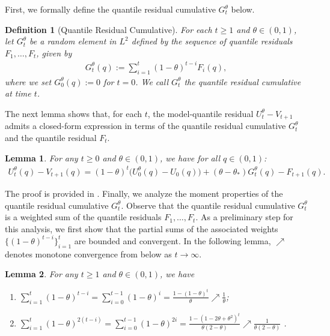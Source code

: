 \documentclass[a4paper, 11pt]{article}
\newtheorem{lemma}{Lemma}
\newtheorem{definition}{Definition}
\theoremstyle{definition}
\begin{document}
First, we formally define the quantile residual cumulative $G_t^\theta$ below.

\begin{definition}[Quantile Residual Cumulative] \label{def:residual_cumulative}
	For each $t \ge 1$ and $\theta \in (0, 1)$, let $G_t^\theta$ be a random element in $L^2$ defined by the sequence of quantile residuals $F_1, \dots, F_{t}$, given by
	\begin{align}
		G_t^\theta(q) := \sum_{i=1}^{t} (1 - \theta)^{t-i} F_i(q) ,
	\end{align}
    where we set $G_0^\theta(q) := 0$ for $t = 0$.
	We call $G_t^\theta$ the quantile residual cumulative at time $t$.
\end{definition}

The next lemma shows that, for each $t$, the model-quantile residual $U_{t}^\theta - V_{t+1}$ admits a closed-form expression in terms of the quantile residual cumulative $G_t^\theta$ and the quantile residual $F_t$.

\begin{lemma} \label{prop:model_quantile_decomposition}    
	For any $t \ge 0$ and $\theta \in (0, 1)$, we have for all $q \in (0, 1)$:
	\begin{align}
		U_{t}^\theta(q) - V_{t+1}(q) = (1 - \theta)^{t} \big( U_0^\theta(q) - U_0(q) \big) + ( \theta - \theta_* ) G_{t}^\theta(q) - F_{t+1}(q) .
	\end{align}
\end{lemma}

The proof is provided in .
Finally, we analyze the moment properties of the quantile residual cumulative $G_t^\theta$.
Observe that the quantile residual cumulative $G_t^\theta$ is a weighted sum of the quantile residuals $F_1, \dots, F_{t}$.
As a preliminary step for this analysis, we first show that the partial sums of the associated weights $\{ (1 - \theta)^{t-i} \}_{i=1}^{t}$ are bounded and convergent.
In the following lemma,  $\nearrow$ denotes monotone convergence from below as $t \to \infty$.

\begin{lemma} \label{lem:w_sum}
	For any $t \ge 1$ and $\theta \in (0, 1)$, we have
    \begin{enumerate}
		\item $\sum_{i=1}^{t} (1 - \theta)^{t-i} = \sum_{i=0}^{t-1} (1 - \theta)^{i} = \frac{ 1 - (1 - \theta)^{t} }{ \theta } \nearrow \frac{1}{\theta}$;
        \item $\sum_{i=1}^{t} (1 - \theta)^{2(t-i)} = \sum_{i=0}^{t-1} (1 - \theta)^{2 i} = \frac{ 1 - (1 - 2 \theta + \theta^2)^{t} }{ \theta ( 2 - \theta ) } \nearrow \frac{1}{\theta (2 - \theta)}$ .
	\end{enumerate}
\end{lemma}
\end{document}
